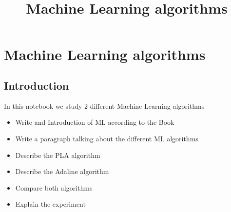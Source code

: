 \documentclass[11pt]{article}
\title{Machine Learning algorithms}
\begin{document}
    
    
    \maketitle
    
    

    
    \section{Machine Learning algorithms}\label{machine-learning-algorithms}

    \subsection{Introduction}\label{introduction}

In this notebook we study 2 different Machine Learning algorithms

    \begin{itemize}
\item
  Write and Introduction of ML according to the Book
\item
  Write a paragraph talking about the different ML algorithms
\item
  Describe the PLA algorithm
\item
  Describe the Adaline algorithm
\item
  Compare both algorithms
\item
  Explain the experiment
\end{itemize}
\end{document}
